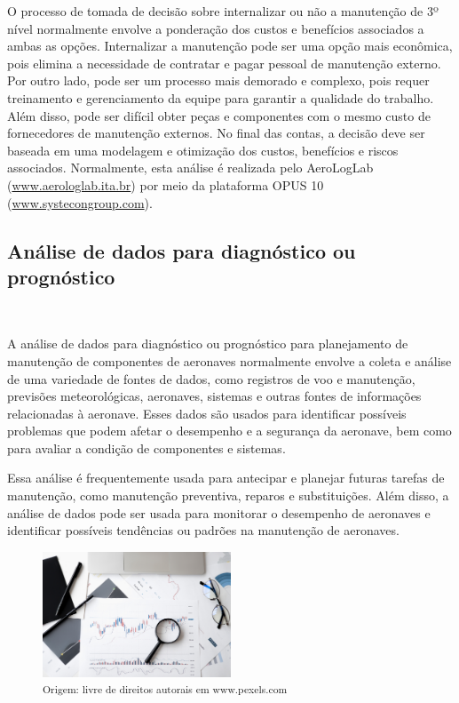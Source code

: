 \documentclass{abntex2}
\begin{document}
\begin{sloppypar}
O processo de tomada de decisão sobre internalizar ou não a manutenção de 3º nível normalmente envolve a ponderação dos custos e benefícios associados a ambas as opções. Internalizar a manutenção pode ser uma opção mais econômica, pois elimina a necessidade de contratar e pagar pessoal de manutenção externo. Por outro lado, pode ser um processo mais demorado e complexo, pois requer treinamento e gerenciamento da equipe para garantir a qualidade do trabalho. Além disso, pode ser difícil obter peças e componentes com o mesmo custo de fornecedores de manutenção externos. No final das contas, a decisão deve ser baseada em uma modelagem e otimização dos custos, benefícios e riscos associados.
Normalmente, esta análise é realizada pelo AeroLogLab (\url{www.aerologlab.ita.br}) por meio da plataforma OPUS 10 (\url{www.systecongroup.com}).

\subsection{Análise de dados para diagnóstico ou prognóstico}\

A análise de dados para diagnóstico ou prognóstico para planejamento de manutenção de componentes de aeronaves normalmente envolve a coleta e análise de uma variedade de fontes de dados, como registros de voo e manutenção, previsões meteorológicas, aeronaves, sistemas e outras fontes de informações relacionadas à aeronave. Esses dados são usados para identificar possíveis problemas que podem afetar o desempenho e a segurança da aeronave, bem como para avaliar a condição de componentes e sistemas.

Essa análise é frequentemente usada para antecipar e planejar futuras tarefas de manutenção, como manutenção preventiva, reparos e substituições. Além disso, a análise de dados pode ser usada para monitorar o desempenho de aeronaves e identificar possíveis tendências ou padrões na manutenção de aeronaves.

\begin{figure}[h]
	\centering
	\includegraphics[width=0.5\textwidth]{Images/analise_dados.jpg}\\
	\small\textsuperscript{Origem: livre de direitos autorais em www.pexels.com}
\end{figure}


\end{sloppypar}
\end{document}
